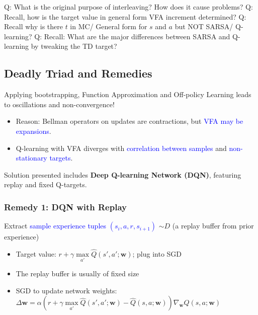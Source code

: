 \documentclass{article}
\begin{document}
\begin{hintbox}
    Q: What is the original purpose of interleaving? How does it cause problems?
    Q: Recall, how is the target value in general form VFA increment determined?
    Q: Recall why is there $t$ in MC/ General form for $s$ and $a$ but NOT SARSA/ Q-learning?
    Q: Recall: What are the major differences between SARSA and Q-learning by tweaking the TD target?
\end{hintbox}

\subsection{Deadly Triad and Remedies}
Applying bootstrapping, Function Approximation and Off-policy Learning leads to oscillations and non-convergence!
\begin{itemize}
\item Reason: Bellman operators on updates are contractions, but \textcolor{blue}{VFA may be expansions}.
\item Q-learning with VFA diverges with \textcolor{blue}{correlation between samples} and \textcolor{blue}{non-stationary targets}.
\end{itemize}

Solution presented includes \textbf{Deep Q-learning Network (DQN)}, featuring replay and fixed Q-targets.
\begin{defbox}
    \subsubsection*{Remedy 1: DQN with Replay}
    Extract \textcolor{blue}{sample experience tuples $(s_{i}, a, r, s_{i+1})$} $\sim D$ (a replay buffer from prior experience)
    \begin{itemize}
    \item Target value: $r + \gamma \mathop{\max}\limits_{a'} \hat{Q}(s', a'; \mathbf{w})$; plug into SGD
    \item The replay buffer is usually of fixed size
    \item SGD to update network weights: $\Delta \mathbf{w} = \alpha \left( r + \gamma \mathop{\max}\limits_{a'} \hat{Q}(s', a'; \mathbf{w}) - \hat{Q}(s, a; \mathbf{w})\right) \nabla_{\mathbf{w}} \hat{Q}(s, a; \mathbf{w})$
    \end{itemize}
\end{defbox}
\end{document}
